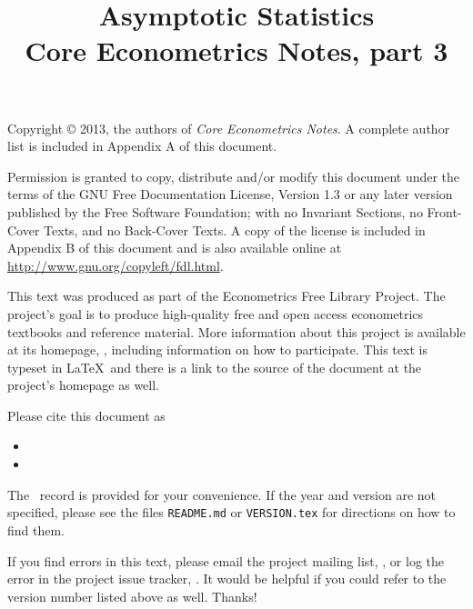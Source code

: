 \documentclass[nohyper]{tufte-handout}
\title[Asymptotic statistics]%
{Asymptotic Statistics \\
  Core Econometrics Notes, part 3}
\begin{document}
\maketitle

\bigskip\noindent%
Copyright © 2013, the authors of \textit{Core Econometrics Notes}.
A complete author list is included in Appendix A of this document.

Permission is granted to copy, distribute and/or modify this document
under the terms of the GNU Free Documentation License, Version 1.3 or
any later version published by the Free Software Foundation; with no
Invariant Sections, no Front-Cover Texts, and no Back-Cover Texts.  A
copy of the license is included in Appendix B of this document and is
also available online at \url{http://www.gnu.org/copyleft/fdl.html}.

This text was produced as part of the Econometrics Free Library
Project.  The project's goal is to produce high-quality free and
open access econometrics textbooks and reference material.  More
information about this project is available at its homepage,
\homepage, including information on how
to participate.  This text is typeset in \LaTeX\ and there is a link
to the source of the document at the project's homepage as well.

Please cite this document as
\begin{itemize}
\item[] 
\item[] 
\end{itemize}
The \BibTeX\ record is provided for your convenience.
If the year and version are not specified, please see the files
\texttt{README.md} or \texttt{VERSION.tex} for directions on how to
find them.

If you find errors in this text, please email the project mailing
list, \maillist, or log the error in the project issue tracker,
\bugtrack.  It would be helpful if you could refer to the version
number listed above as well.  Thanks!

\tableofcontents










\end{document}
